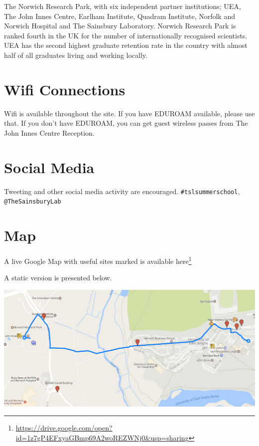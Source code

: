 \documentclass[12pt,]{book}
\let\rmarkdownfootnote\footnote%
\def\footnote{\protect\rmarkdownfootnote}
\renewcommand{\href}[2]{#2\footnote{\url{#1}}}
\begin{document}
The Norwich Research Park, with six independent partner institutions;
UEA, The John Innes Centre, Earlham Institute, Quadram Institute,
Norfolk and Norwich Hospital and The Sainsbury Laboratory. Norwich
Research Park is ranked fourth in the UK for the number of
internationally recognised scientists. UEA has the second highest
graduate retention rate in the country with almost half of all graduates
living and working locally.

\section*{Wifi Connections}\label{wifi-connections}

Wifi is available throughout the site. If you have EDUROAM available,
please use that. If you don't have EDUROAM, you can get guest wireless
passes from The John Innes Centre Reception.

\section*{Social Media}\label{social-media}

Tweeting and other social media activity are encouraged.
\texttt{\#tslsummerschool}, \texttt{@TheSainsburyLab}

\section*{Map}\label{map}

A live Google Map with useful sites marked is available
\href{https://drive.google.com/open?id=1z7gP4EFxyaGBmp69A2woREZWNj0\&usp=sharing}{here}

A static version is presented below.

\includegraphics[width=6.11in]{assets/large_map}
\end{document}
